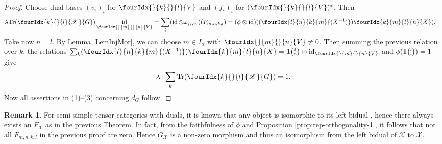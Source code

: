 \documentclass[10pt]{article}
\DeclareMathOperator{\id}{id}
\newcommand{\dual}[1]{#1^{*}}
\newcommand{\Tr}{\mathrm{Tr}}
\newcommand{\Grt}[3]{#1{\tiny{\begin{pmatrix} #2\\#3\end{pmatrix}}}}
\newcommand{\UnitC}[2]{\Grt{\mathbf{1}}{#1}{#2}}
\newcommand{\Gr}[5]{\fourIdx{#2}{#4}{#3}{#5}{#1}}%
\newcommand{\Gru}[3]{\Gr{#1}{}{}{#2}{#3}}
\theoremstyle{definition}
\newtheorem{Rem}[Theorem]{Remark}
\numberwithin{equation}{section}
\begin{document}
\begin{proof}
  Choose dual  bases
  $(v_{i})_{i}$ for $\Gru{V}{k}{l}$ and $(f_{i})_{i}$ for  $\dual{(\Gru{V}{k}{l})}$. Then
  \begin{align*}
    \lambda   \Tr( \Gr{G}{k}{l}{}{\mathscr{X}}) \id_{\Gru{V}{m}{n}}
 &= \sum_{i} (\id \otimes
    \omega_{f_{i},v_{i}})(F_{m,n,k,l}) = (\phi \otimes
    \id)((\Gr{(X^{-1})}{l}{k}{n}{m}) \Gr{X}{k}{l}{m}{n}).
  \end{align*}
  Take now $n=l$.  By Lemma \ref{LemInjMor}, we can choose $m\in I_{\alpha}$ with $\Gru{V}{m}{n}\neq 0$.   Then summing the previous relation over $k$, the relations $\sum_{k}
  (\Gr{(X^{-1})}{l}{k}{n}{m}) \Gr{X}{k}{l}{m}{n} = \UnitC{l}{n}
  \otimes \id_{\Gru{V}{m}{n}}$ and
  $\phi(\UnitC{l}{l})=1$ give
\begin{align*}
\lambda \cdot  \sum_{k} \Tr(\Gr{G}{k}{l}{}{\mathscr{X}}) = 1.  
\end{align*}
Now all assertions in (1)--(3) concerning $d_G$ follow.
\end{proof}

\begin{Rem} For semi-simple tensor categories with duals, it is known
  that any object is isomorphic to its left bidual \cite[Proposition 2.1]{ENO1}, hence there always exists an $F_{\mathscr{X}}$ as in the previous Theorem. In fact, from the faithfulness of $\phi$ and Proposition \ref{prop:rep-orthogonality-1}, it follows that not all $F_{m,n,k,l}$ in the previous proof are zero. Hence $G_{\mathscr{X}}$ is a non-zero morphism and thus an isomorphism from the left bidual of $\mathscr{X}$ to $\mathscr{X}$.  
\end{Rem}
\end{document}
